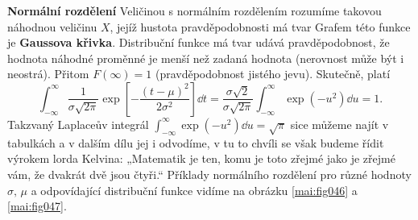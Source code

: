 \wikitextrule
\begin{example}\label{mai:exam069}
  \textbf{Normální rozdělení}\newline\small
  Veličinou s normálním rozdělením rozumíme takovou náhodnou veličinu \(X\), jejíž hustota 
  pravděpodobnosti má tvar
  Grafem této funkce je \textbf{Gaussova křivka}. Distribuční funkce má tvar
  udává pravděpodobnost, že hodnota náhodné proměnné je menší než zadaná hodnota (nerovnost může 
  být i neostrá). Přitom \(F(\infty) = 1\) (pravděpodobnost jistého jevu). Skutečně, platí
  \begin{equation*}
    \int_{-\infty}^{\infty}\dfrac{1}{\sigma\sqrt{2\pi}}
           \exp\left[-\dfrac{(t-\mu)^2}{2\sigma^2}\right]\dd{t}
    = \dfrac{\sigma\sqrt{2}}{\sigma\sqrt{2\pi}}
      \int_{-\infty}^{\infty}\exp\left(-u^2\right)\dd{u}
    =1.
  \end{equation*}
  Takzvaný Laplaceův integrál \(\int_{-\infty}^{\infty}\exp(-u^2)\dd{u} = \sqrt{\pi}\) 
  sice můžeme najít v tabulkách a v dalším dílu jej i odvodíme, v tu to chvíli se však budeme řídit 
  výrokem lorda Kelvina: „Matematik je ten, komu je toto zřejmé jako je zřejmé vám, že dvakrát dvě 
  jsou čtyři.“ Příklady normálního rozdělení pro různé hodnoty \(\sigma,\,\mu\) a odpovídající 
  distribuční funkce vidíme na obrázku \ref{mai:fig046} a \ref{mai:fig047}.


\end{example}
